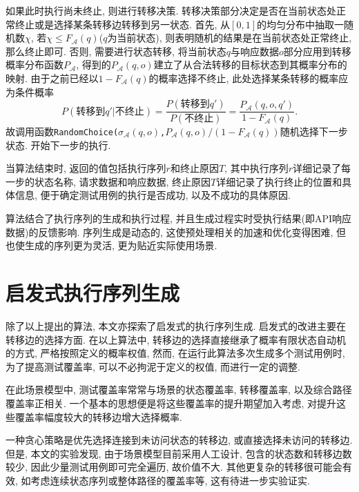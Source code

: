         如果此时执行尚未终止, 则进行转移决策. 转移决策部分决定是否在当前状态处正常终止或是选择某条转移边转移到另一状态. 首先, 从$[0,1]$的均匀分布中抽取一随机数$\chi$, 若$\chi \le F_{\mathcal{A}}(q)$($q$为当前状态), 则表明随机的结果是在当前状态处正常终止, 那么终止即可. 否则, 需要进行状态转移, 将当前状态$q$与响应数据$o$部分应用到转移概率分布函数$P_{\mathcal{A}}$, 得到的$P_{\mathcal{A}}(q,o)$建立了从合法转移的目标状态到其概率分布的映射. 由于之前已经以$1 - F_{\mathcal{A}}(q)$的概率选择不终止, 此处选择某条转移的概率应为条件概率
        \begin{equation}
            P(\text{转移到}q' | \text{不终止}) = \dfrac{P(\text{转移到}q')} {P(\text{不终止})} = \dfrac{P_{\mathcal{A}}(q,o,q')} {1 - F_{\mathcal{A}}(q)}.
        \end{equation}
        故调用函数\texttt{RandomChoice(}$\sigma_{\mathcal{A}}(q,o)$\texttt{,}$P_{\mathcal{A}}(q,o)/\left(1-F_{\mathcal{A}}(q)\right)$随机选择下一步状态. 开始下一步的执行.
        
        当算法结束时, 返回的值包括执行序列$r$和终止原因$T$, 其中执行序列$r$详细记录了每一步的状态名称, 请求数据和响应数据, 终止原因$T$详细记录了执行终止的位置和具体信息, 便于确定测试用例的执行是否成功, 以及不成功的具体原因.
        
        算法结合了执行序列的生成和执行过程, 并且生成过程实时受执行结果(即API响应数据)的反馈影响. 序列生成是动态的, 这使预处理相关的加速和优化变得困难, 但也使生成的序列更为灵活, 更为贴近实际使用场景.
        
    \section{启发式执行序列生成}
        除了以上提出的算法, 本文亦探索了启发式的执行序列生成. 启发式的改进主要在转移边的选择方面. 在以上算法中, 转移边的选择直接继承了概率有限状态自动机的方式, 严格按照定义的概率权值, 然而, 在运行此算法多次生成多个测试用例时, 为了提高测试覆盖率, 可以不必拘泥于定义的权值, 而进行一定的调整.
        
        在此场景模型中, 测试覆盖率常常与场景的状态覆盖率, 转移覆盖率, 以及综合路径覆盖率正相关. 一个基本的思想便是将这些覆盖率的提升期望加入考虑, 对提升这些覆盖率幅度较大的转移边增大选择概率.
        
        一种贪心策略是优先选择连接到未访问状态的转移边, 或直接选择未访问的转移边. 但是, 本文的实验发现, 由于场景模型目前采用人工设计, 包含的状态数和转移边数较少, 因此少量测试用例即可完全遍历, 故价值不大. 其他更复杂的转移很可能会有效, 如考虑连续状态序列或整体路径的覆盖率等, 这有待进一步实验证实.
        
